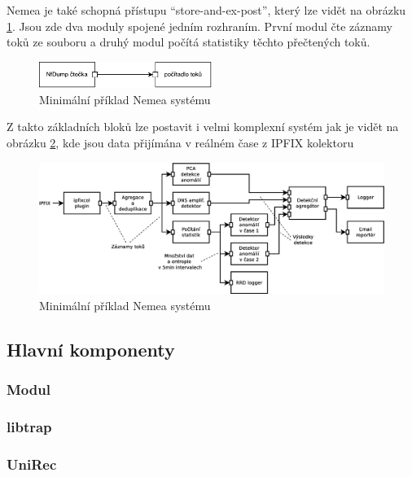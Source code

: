 Nemea je také schopná přístupu ``store-and-ex-post'', který lze vidět na obrázku \ref{fig:nemea-schema}. Jsou zde dva moduly spojené jedním rozhraním. První modul čte záznamy toků ze souboru a druhý modul počítá statistiky těchto přečtených toků. 
\begin{figure}[ht]
  \centering
    \includegraphics[width=0.5\textwidth]{fig/nemea-basic.pdf}
  \caption{Minimální příklad Nemea systému} \label{fig:nemea-schema}
  
\end{figure}

Z takto základních bloků lze postavit i velmi komplexní systém jak je vidět na obrázku \ref{fig:nemea-example-2}, kde jsou data přijímána v reálném čase z IPFIX\cite{ipfix} kolektoru

\begin{figure}
  \centering
    \includegraphics[width=1\textwidth]{fig/nemea-example-2-cz.eps}
  \caption{Minimální příklad Nemea systému} \label{fig:nemea-example-2}
  
\end{figure}




\subsection{Hlavní komponenty}

\subsubsection{Modul}

\subsubsection{libtrap}

\subsubsection{UniRec}

